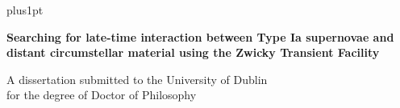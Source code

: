 \documentclass[a4paper,oneside,12pt]{Latex/Classes/PhDthesisPSnPDF}
\begin{document}

\renewcommand\baselinestretch{1.2}
\baselineskip=18pt plus1pt


\newcommand{\titlefont}{\bfseries \fontsize{22}{26.42pt}\selectfont}
\newcommand{\largetitlefont}{\bfseries \fontsize{29.88}{35.88pt}\selectfont}
\newcommand{\othertitlefont}{\fontsize{14.4}{17.28}\selectfont}
\newcommand{\authorfont}{\bfseries \fontsize{14.4}{17.28}\selectfont}
\newcommand{\informationfont}{\fontsize{10}{12}\selectfont}
\newcommand{\dedicationfont}{\slshape \fontsize{14.4}{17.28}\selectfont}

\newcommand{\thisyear}{\number\year}
\def\thismonth{\ifcase\month\or January\or February\or March\or
  April\or May\or June\or July\or August\or September\or October\or November\or December\fi}
\newcommand{\todaysdate}{\thismonth\space \thisyear}

\renewcommand{\baselinestretch}{1}
\newpage \thispagestyle{empty}
\begin{flushright}



\Huge{\textbf{Searching for late-time interaction between Type Ia supernovae and distant circumstellar material using the Zwicky Transient Facility}}

\end{flushright}

\vspace*{2cm}
\begin{flushright}
A dissertation submitted to the University of Dublin \\
for the degree of Doctor of Philosophy
\end{flushright}
\end{document}
